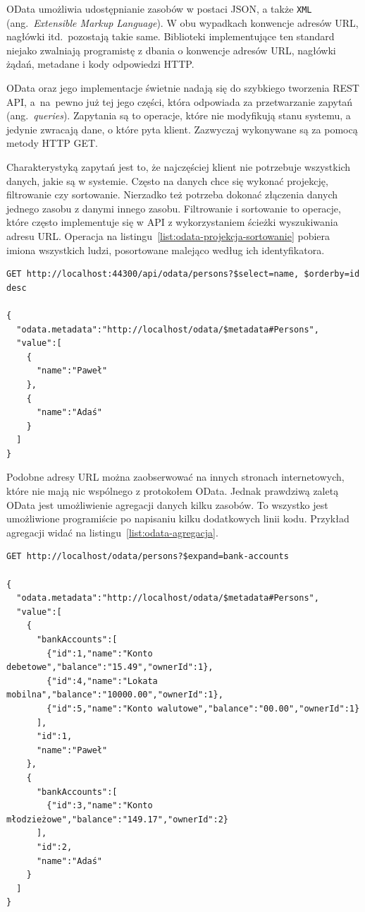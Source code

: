 OData umożliwia udostępnianie zasobów w postaci JSON, a także \texttt{XML} (ang.~\emph{Extensible Markup Language}). W obu wypadkach konwencje adresów URL, nagłówki itd.~pozostają takie same.
Biblioteki implementujące ten standard niejako zwalniają programistę z dbania o konwencje adresów URL, nagłówki żądań, metadane i kody odpowiedzi HTTP. 

OData oraz jego implementacje świetnie nadają się do szybkiego tworzenia REST API, a~na~pewno już tej jego części, która odpowiada za przetwarzanie zapytań (ang.~\emph{queries}). Zapytania są to operacje, które nie modyfikują stanu systemu, a jedynie zwracają dane, o które pyta klient. Zazwyczaj wykonywane są za pomocą metody HTTP GET. 

Charakterystyką zapytań jest to, że najczęściej klient nie potrzebuje wszystkich danych, jakie są w systemie. Często na danych chce się wykonać projekcję, filtrowanie czy sortowanie. Nierzadko też potrzeba dokonać złączenia danych jednego zasobu z danymi innego zasobu. Filtrowanie i sortowanie to operacje, które często implementuje się w API z wykorzystaniem ścieżki wyszukiwania adresu URL. Operacja na listingu~\ref{list:odata-projekcja-sortowanie} pobiera imiona wszystkich ludzi, posortowane malejąco według ich identyfikatora.

\begin{lstlisting}[label=list:odata-projekcja-sortowanie,
    caption=OData -- przykład projekcji i sortowania]
GET http://localhost:44300/api/odata/persons?$select=name, $orderby=id desc

{
  "odata.metadata":"http://localhost/odata/$metadata#Persons",
  "value":[
    {
      "name":"Paweł"
    },
    {
      "name":"Adaś"
    }
  ]
}
\end{lstlisting} 

Podobne adresy URL można zaobserwować na innych stronach internetowych, które nie mają nic wspólnego z protokołem OData. Jednak prawdziwą zaletą OData jest umożliwienie agregacji danych kilku zasobów. To wszystko jest umożliwione programiście po napisaniu kilku dodatkowych linii kodu. Przykład agregacji widać na listingu~\ref{list:odata-agregacja}.

\begin{lstlisting}[label=list:odata-agregacja,
    caption=OData -- przykład agregacji danych]
GET http://localhost/odata/persons?$expand=bank-accounts

{
  "odata.metadata":"http://localhost/odata/$metadata#Persons",
  "value":[
    {
      "bankAccounts":[
        {"id":1,"name":"Konto debetowe","balance":"15.49","ownerId":1},
        {"id":4,"name":"Lokata mobilna","balance":"10000.00","ownerId":1},
        {"id":5,"name":"Konto walutowe","balance":"00.00","ownerId":1}
      ],
      "id":1,
      "name":"Paweł"
    },
    {
      "bankAccounts":[
        {"id":3,"name":"Konto młodzieżowe","balance":"149.17","ownerId":2}
      ],
      "id":2,
      "name":"Adaś"
    }
  ]
}
\end{lstlisting}

